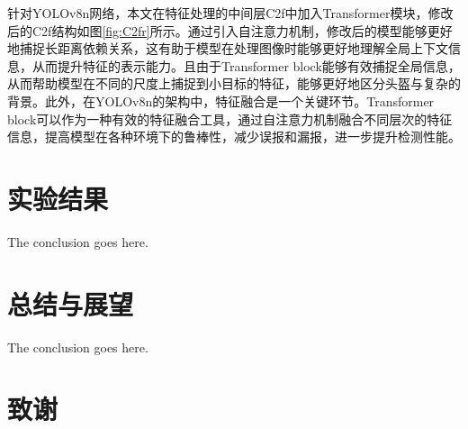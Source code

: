 \documentclass[journal]{IEEEtran}
\begin{document}
针对YOLOv8n网络，本文在特征处理的中间层C2f中加入Transformer模块，修改后的C2f结构如图\ref{fig:C2fr}所示。通过引入自注意力机制，修改后的模型能够更好地捕捉长距离依赖关系，这有助于模型在处理图像时能够更好地理解全局上下文信息，从而提升特征的表示能力。且由于Transformer block能够有效捕捉全局信息，从而帮助模型在不同的尺度上捕捉到小目标的特征，能够更好地区分头盔与复杂的背景。此外，在YOLOv8n的架构中，特征融合是一个关键环节。Transformer block可以作为一种有效的特征融合工具，通过自注意力机制融合不同层次的特征信息，提高模型在各种环境下的鲁棒性，减少误报和漏报，进一步提升检测性能。




\section{实验结果}
The conclusion goes here.

\section{总结与展望}
The conclusion goes here.


%

\section*{致谢}
\end{document}
